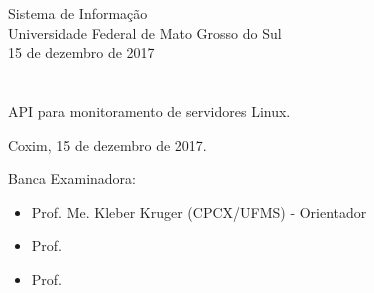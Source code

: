 \vskip 0.5cm
\begin{center}
Sistema de Informação\\
Universidade Federal de Mato Grosso do Sul\\
15 de dezembro de 2017
\end{center}
		

\chapter*{}

\begin{center}

\begin{minipage}[t]{10cm}
	\begin{center}
		\vspace{-2cm}
		{{\Large API para monitoramento de servidores Linux.}} 
	\end{center}
\end{minipage}

\end{center}


\begin{flushright}
	\vspace{12cm}
	Coxim, 15 de dezembro de 2017.
	
\end{flushright}

\vspace{2cm}
Banca Examinadora:

\begin{itemize}
	\item Prof. Me. Kleber Kruger (CPCX/UFMS) - Orientador
	\item Prof. %
	\item Prof. %
\end{itemize}
